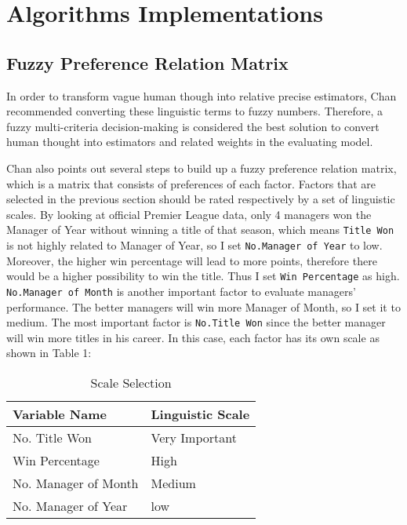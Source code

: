 \documentclass[12pt,a4paper]{article}
\begin{document}
\section{Algorithms Implementations}

\subsection{Fuzzy Preference Relation Matrix}

	In order to transform vague human though into relative precise estimators, Chan recommended converting these linguistic terms to fuzzy numbers. Therefore, a fuzzy multi-criteria decision-making is considered the best solution to convert human thought into estimators and related weights in the evaluating model.
	
	Chan also points out several steps to build up a fuzzy preference relation matrix, which is a matrix that consists of preferences of each factor. Factors that are selected in the previous section should be rated respectively by a set of linguistic scales. By looking at official Premier League data, only 4 managers won the Manager of Year without winning a title of that season, which means \texttt{Title Won} is not highly related to Manager of Year, so I set \texttt{No.Manager of Year} to low. Moreover, the higher win percentage will lead to more points, therefore there would be a higher possibility to win the title. Thus I set \texttt{Win Percentage} as high. \texttt{No.Manager of Month} is another important factor to evaluate managers' performance. The better managers will win more Manager of Month, so I set it to medium. The most important factor is \texttt{No.Title Won} since the better manager will win more titles in his career. In this case, each factor has its own scale as shown in Table 1:
	
	\begin{table}[h]
		\centering
		\caption{Scale Selection}
		\begin{tabular}{ll}
			\textbf{Variable Name} & \textbf{Linguistic Scale}\\
			\hline\hline
			No. Title Won & Very Important \\
			Win Percentage & High \\
			No. Manager of Month & Medium \\
			No. Manager of Year & low\\
			\hline\hline
		\end{tabular}
	\end{table}
	
\end{document}
